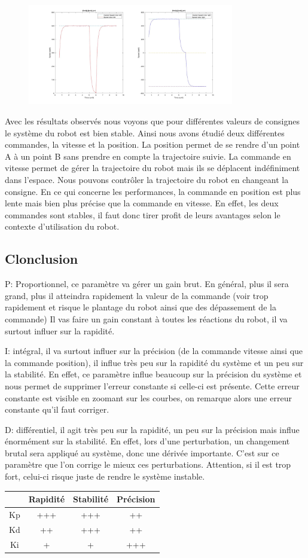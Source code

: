\documentclass[a4paper]{article}
\begin{document}
		\begin{figure}[h]
			\centering
			\includegraphics[width = 9cm]{imgs/fig10.jpg}
			\caption{}
		\end{figure}
		Avec les résultats observés nous voyons que pour différentes valeurs de consignes le système du robot est bien stable. 
		Ainsi nous avons étudié deux différentes commandes, la vitesse et la position. 
		La position permet de se rendre d’un point A à un point B sans prendre en compte la trajectoire suivie.
		La commande en vitesse permet de gérer la trajectoire du robot mais ils se déplacent indéfiniment dans l’espace. Nous pouvons contrôler la trajectoire du robot en changeant la consigne. 
		En ce qui concerne les performances, la commande en position est plus lente mais bien plus précise que la commande en vitesse. En effet, les deux commandes sont stables, il faut donc tirer profit de leurs avantages selon le contexte d’utilisation du robot. 
		
	
	\subsection{Clonclusion}
	P: Proportionnel, ce paramètre va gérer un gain brut. En général, plus il sera grand, plus il atteindra rapidement
	la valeur de la commande (voir trop rapidement et risque le plantage du robot ainsi que des dépassement de la commande)
	Il vas faire un gain constant à toutes les réactions du robot, il va surtout influer sur la rapidité.
		
	I: intégral, il va surtout influer sur la précision (de la commande vitesse ainsi que la commande position), il influe très peu sur la rapidité du système et un peu sur la stabilité. En effet, ce paramètre influe beaucoup sur la précision du système et nous permet de supprimer l'erreur constante si celle-ci est présente. Cette erreur constante est visible en zoomant sur les courbes, on remarque alors une erreur constante qu'il faut corriger.
	
	D: différentiel, il agit très peu sur la rapidité, un peu sur la précision mais influe énormément sur la stabilité. En effet, lors d'une perturbation, un changement brutal sera appliqué au système, donc une dérivée importante. C'est sur ce paramètre que l'on corrige le mieux ces perturbations.
	Attention, si il est trop fort, celui-ci risque juste de rendre le système instable.
	
	\begin{center}
		\begin{tabular}{||c|c|c|c||}
			\hline
			 & Rapidité & Stabilité & Précision \\[0.5ex]
			\hline \hline
			Kp & +++ & +++ & ++ \\
			\hline
			Kd & ++ & +++ & ++ \\
			\hline
			Ki & + & + & +++\\
			\hline
		\end{tabular}
	\end{center}
\end{document}
